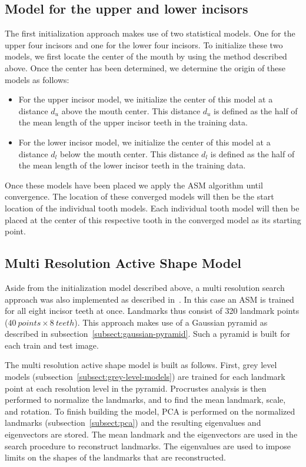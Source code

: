 \documentclass[a4paper]{article}
\begin{document}
\subsection{Model for the upper and lower incisors}
\label{subsect:upper-lower-incisors}
The first initialization approach makes use of two statistical models. 
One for the upper four incisors and one for the lower four incisors.
To initialize these two models, we first locate the center of the mouth by using the method described above.
Once the center has been determined, we determine the origin of these models as follows:
\begin{itemize}
\item For the upper incisor model, we initialize the center of this model at a distance $d_u$ above the mouth center.
This distance $d_u$ is defined as the half of the mean length of the upper incisor teeth in the training data.
\item For the lower incisor model, we initialize the center of this model at a distance $d_l$ below the mouth center.
This distance $d_l$ is defined as the half of the mean length of the lower incisor teeth in the training data.
\end{itemize}
Once these models have been placed we apply the ASM algorithm until convergence.
The location of these converged models will then be the start location of the individual tooth models.
Each individual tooth model will then be placed at the center of this respective tooth in the converged model as its starting point.

\subsection{Multi Resolution Active Shape Model}
\label{subsect:multi-res}
Aside from the initialization model described above, a multi resolution search approach was also implemented as described in~\cite{Cootes1992AnIT}. 
In this case an ASM is trained for all eight incisor teeth at once.
Landmarks thus consist of 320 landmark points ($40\ points \times 8\ teeth$).
This approach makes use of a Gaussian pyramid as described in subsection~\ref{subsect:gaussian-pyramid}. 
Such a pyramid is built for each train and test image. 
\bigskip

The multi resolution active shape model is built as follows.
First, grey level models (subsection~\ref{subsect:grey-level-models}) are trained for each landmark point at each resolution level in the pyramid. 
Procrustes analysis is then performed to normalize the landmarks, and to find the mean landmark, scale, and rotation.
To finish building the model, PCA is performed on the normalized landmarks (subsection~\ref{subsect:pca}) and the resulting eigenvalues and eigenvectors are stored. 
The mean landmark and the eigenvectors are used in the search procedure to reconstruct landmarks. 
The eigenvalues are used to impose limits on the shapes of the landmarks that are reconstructed.
\end{document}
